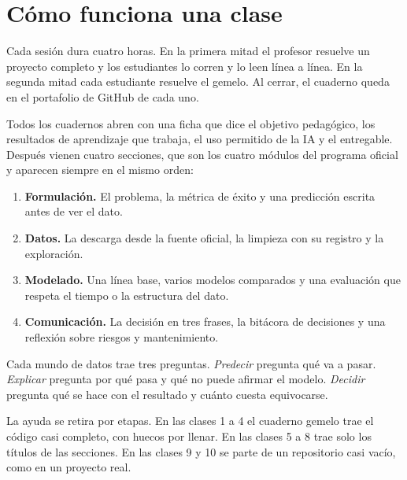\documentclass[12pt,letterpaper]{article}
\begin{document}
\section{Cómo funciona una clase}
Cada sesión dura cuatro horas. En la primera mitad el profesor resuelve un proyecto completo y los estudiantes lo corren y lo leen línea a línea. En la segunda mitad cada estudiante resuelve el gemelo. Al cerrar, el cuaderno queda en el portafolio de GitHub de cada uno.

Todos los cuadernos abren con una ficha que dice el objetivo pedagógico, los resultados de aprendizaje que trabaja, el uso permitido de la IA y el entregable. Después vienen cuatro secciones, que son los cuatro módulos del programa oficial y aparecen siempre en el mismo orden:
\begin{enumerate}[label=\arabic*.]
    \item \textbf{Formulación.} El problema, la métrica de éxito y una predicción escrita antes de ver el dato.
    \item \textbf{Datos.} La descarga desde la fuente oficial, la limpieza con su registro y la exploración.
    \item \textbf{Modelado.} Una línea base, varios modelos comparados y una evaluación que respeta el tiempo o la estructura del dato.
    \item \textbf{Comunicación.} La decisión en tres frases, la bitácora de decisiones y una reflexión sobre riesgos y mantenimiento.
\end{enumerate}

Cada mundo de datos trae tres preguntas. \emph{Predecir} pregunta qué va a pasar. \emph{Explicar} pregunta por qué pasa y qué no puede afirmar el modelo. \emph{Decidir} pregunta qué se hace con el resultado y cuánto cuesta equivocarse.

La ayuda se retira por etapas. En las clases 1 a 4 el cuaderno gemelo trae el código casi completo, con huecos por llenar. En las clases 5 a 8 trae solo los títulos de las secciones. En las clases 9 y 10 se parte de un repositorio casi vacío, como en un proyecto real.

\newpage
\end{document}
